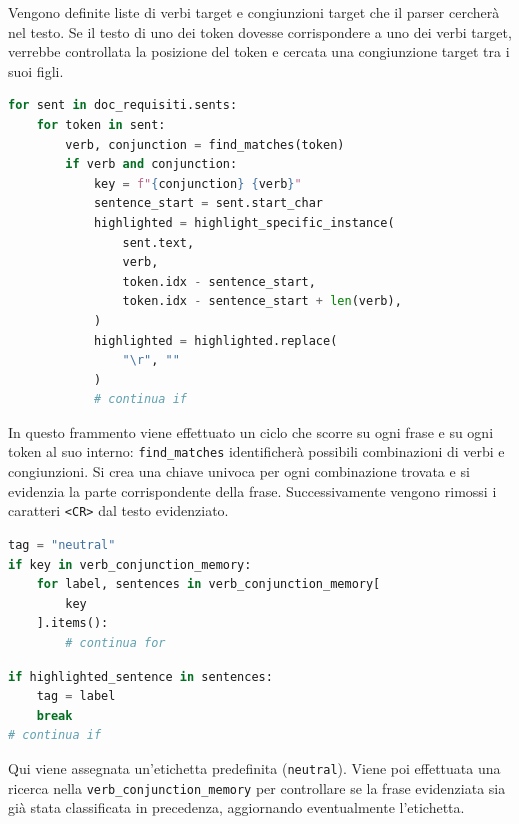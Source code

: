 \documentclass[12pt]{report}
\begin{document}
Vengono definite liste di verbi target e congiunzioni target che il parser cercherà nel testo. Se il testo di uno dei token dovesse corrispondere a uno dei verbi target, verrebbe controllata la posizione del token e cercata una congiunzione target tra i suoi figli.


\begin{mdframed}
\small
\begin{lstlisting}[language=Python]
for sent in doc_requisiti.sents:
    for token in sent:
        verb, conjunction = find_matches(token)
        if verb and conjunction:
            key = f"{conjunction} {verb}"
            sentence_start = sent.start_char
            highlighted = highlight_specific_instance(
                sent.text,
                verb,
                token.idx - sentence_start,
                token.idx - sentence_start + len(verb),
            )
            highlighted = highlighted.replace(
                "\r", ""
            )
            # continua if
\end{lstlisting}
\end{mdframed}

\noindent In questo frammento viene effettuato un ciclo che scorre su ogni frase e su ogni token al suo interno: \texttt{find\_matches} identificherà possibili combinazioni di verbi e congiunzioni. Si crea una chiave univoca per ogni combinazione trovata e si evidenzia la parte corrispondente della frase. Successivamente vengono rimossi i caratteri \texttt{<CR>} dal testo evidenziato.


\begin{mdframed}
\small
\begin{lstlisting}[language=Python]
tag = "neutral"
if key in verb_conjunction_memory:
    for label, sentences in verb_conjunction_memory[
        key
    ].items():
        # continua for
\end{lstlisting}
\end{mdframed}

\begin{mdframed}
\small
\begin{lstlisting}[language=Python]
if highlighted_sentence in sentences:
    tag = label
    break
# continua if
\end{lstlisting}
\end{mdframed}

\noindent Qui viene assegnata un'etichetta predefinita (\texttt{neutral}). Viene poi effettuata una ricerca nella \texttt{verb\_conjunction\_memory} per controllare se la frase evidenziata sia già stata classificata in precedenza, aggiornando eventualmente l'etichetta.
\end{document}
